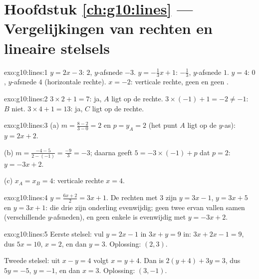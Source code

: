 \section*{Hoofdstuk \ref{ch:g10:lines} --- Vergelijkingen van rechten en lineaire stelsels}

\begin{solution}{exo:g10:lines:1}
$y = 2x - 3$:  $2$, $y$-afsnede $-3$.
$y = -\frac13 x + 1$:  $-\frac13$, $y$-afsnede $1$.
$y = 4$:  $0$, $y$-afsnede $4$ (horizontale rechte).
$x = -2$: verticale rechte, geen  en geen .
\end{solution}

\begin{solution}{exo:g10:lines:2}
$3 \times 2 + 1 = 7$: ja, $A$ ligt op de rechte.
$3 \times (-1) + 1 = -2 \neq -1$: $B$ niet.
$3 \times 4 + 1 = 13$: ja, $C$ ligt op de rechte.
\end{solution}

\begin{solution}{exo:g10:lines:3}
(a) $m = \frac{8 - 2}{3 - 0} = 2$ en $p = y_A = 2$ (het punt $A$ ligt op de
$y$-as): $y = 2x + 2$.

(b) $m = \frac{-4 - 5}{2 - (-1)} = \frac{-9}{3} = -3$; daarna geeft
$5 = -3 \times (-1) + p$ dat $p = 2$: $y = -3x + 2$.

(c) $x_A = x_B = 4$: verticale rechte $x = 4$.
\end{solution}

\begin{solution}{exo:g10:lines:4}
$y = \frac{6x+2}{2} = 3x + 1$. De rechten met  $3$ zijn
$y = 3x - 1$, $y = 3x + 5$ en $y = 3x + 1$: die drie zijn onderling
evenwijdig; geen twee ervan vallen samen (verschillende $y$-afsneden), en
geen enkele is evenwijdig met $y = -3x + 2$.
\end{solution}

\begin{solution}{exo:g10:lines:5}
Eerste stelsel: vul $y = 2x - 1$ in $3x + y = 9$ in: $3x + 2x - 1 = 9$, dus
$5x = 10$, $x = 2$, en dan $y = 3$. Oplossing: $(2, 3)$.

Tweede stelsel: uit $x - y = 4$ volgt $x = y + 4$. Dan is
$2(y + 4) + 3y = 3$, dus $5y = -5$, $y = -1$, en dan $x = 3$. Oplossing:
$(3, -1)$.
\end{solution}

